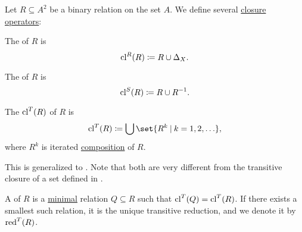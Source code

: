 \begin{definition}\label{def:relation_closures}
  Let \( R \subseteq A^2 \) be a binary relation on the set \( A \). We define several \hyperref[def:closure_operator]{closure operators}:
  \begin{thmenum}
     The  of \( R \) is
    \begin{equation*}
      \operatorname{cl}^R(R) \coloneqq R \cup \Delta_X.
    \end{equation*}

     The  of \( R \) is
    \begin{equation*}
      \operatorname{cl}^S(R) \coloneqq R \cup R^{-1}.
    \end{equation*}

     The  \( \operatorname{cl}^T(R) \) of \( R \) is
    \begin{equation*}
      \cl^T(R) \coloneqq \bigcup \set{ R^k \given k = 1, 2, \ldots },
    \end{equation*}
    where \( R^k \) is iterated \hyperref[def:binary_relation/composition]{composition} of \( R \).

    This is generalized to . Note that both are very different from the transitive closure of a set defined in .

    A  of \( R \) is a \hyperref[def:partially_ordered_set_extremal_points/maximal_and_minimal_element]{minimal} relation \( Q \subseteq R \) such that \( \operatorname{cl}^T(Q) = \operatorname{cl}^T(R) \). If there exists a smallest such relation, it is the unique transitive reduction, and we denote it by \( \operatorname{red}^T(R) \).
  \end{thmenum}
\end{definition}


